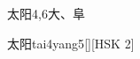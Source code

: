 \begin{entry}{太阳}{4,6}{⼤、⾩}
  \begin{phonetics}{太阳}{tai4yang5}[][HSK 2]
  \end{phonetics}
\end{entry}
